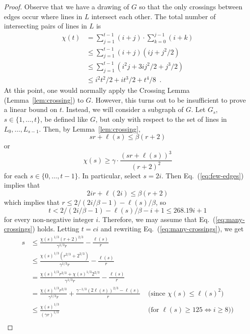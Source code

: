 \documentclass[12pt]{article}
\newcommand{\const}{268.19}
\begin{document}
\begin{proof}
Observe that we have a drawing of $G$ so that the only crossings between
edges occur where lines in $L$ intersect each other.  The total number of
intersecting pairs of lines in $L$ is 
\[
  \begin{aligned}
    \chi(t) 
      & = \sum_{j=1}^{t-1}(i+j)\cdot\sum_{k=0}^{j-1}(i+k) \\
      & \le \sum_{j=1}^{t-1}(i+j)(ij + j^2/2) \\
      & \le \sum_{j=1}^{t-1}(i^2j+3ij^2/2 + j^3/2) \\
      & \le i^2t^2/2 + it^3/2 + t^4/8 \enspace .
  \end{aligned}
\]
At this point, one would normally apply the Crossing Lemma
(Lemma~\ref{lem:crossing}) to $G$.  However, this turns out to be
insufficient to prove a linear bound on $t$.  Instead, we will consider
a subgraph of $G$.  Let $G_{s}$, $s\in\{1,\ldots,t\}$, be defined like
$G$, but only with respect to the set of lines in $L_0,\ldots,L_{s-1}$.
Then, by Lemma~\ref{lem:crossing},
\begin{equation}
   sr + \ell(s) \le \beta(r+2)
     \label{eq:few-edges}
\end{equation}
or
\begin{equation}
  \chi(s) \ge \gamma\cdot\frac{(sr+\ell(s))^3}{(r+2)^2}
     \label{eq:many-crossings}
\end{equation}
for each $s\in\{0,\ldots,t-1\}$.
In particular, select $s=2i$.  Then Eq.~(\ref{eq:few-edges}) implies that
\[  
   2ir + \ell(2i)  \le \beta(r+2)
\]
which implies that $r \le 2/(2i/\beta-1)-\ell(s)/\beta$, so 
\[
  t < 2/(2i/\beta-1) - \ell(s)/\beta - i + 1 \le \const i + 1
\]
for every non-negative integer $i$.
Therefore, we may assume that 
Eq.~(\ref{eq:many-crossings}) holds.
Letting $t=ci$ and 
rewriting Eq.~(\ref{eq:many-crossings}), we get
\[
  \begin{aligned}
  s 
   &\le \frac{\chi(s)^{1/3} (r+2)^{2/3}}{\gamma^{1/3}r} 
       - \frac{\ell(s)}{r} \\ 
   &\le \frac{\chi(s)^{1/3} (r^{2/3}+2^{2/3})}{\gamma^{1/3}r} 
      - \frac{\ell(s)}{r} \\
   & = \frac{\chi(s)^{1/3}r^{2/3}+\chi(s)^{1/3}2^{2/3}}{\gamma^{1/3} r} 
          - \frac{\ell(s)}{r}  \\
   & = \frac{\chi(s)^{1/3}r^{2/3}}{\gamma^{1/3} r} 
           +\frac{\gamma^{-1/3}(2\ell(s))^{2/3} - \ell(s)}{r} 
    & \mbox{ (since $\chi(s) \le \ell(s)^2$)} \\
   &\le \frac{\chi(s)^{1/3}}{(\gamma r)^{1/3}}
    & \mbox{ (for $\ell(s) \ge 125 \Leftrightarrow i\ge 8$))} \\

\end{aligned}\]
\end{proof}
\end{document}
